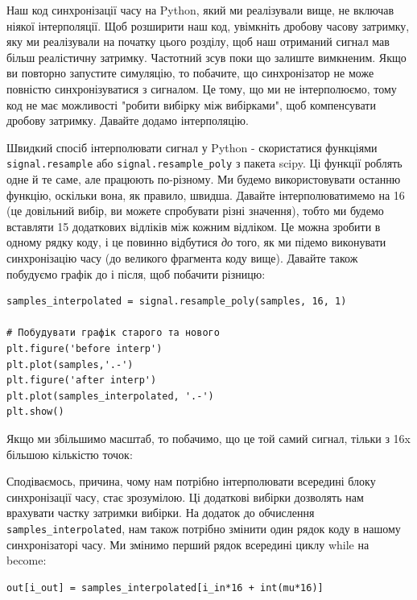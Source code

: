 Наш код синхронізації часу на Python, який ми реалізували вище, не
включав ніякої інтерполяції. Щоб розширити наш код, увімкніть дробову
часову затримку, яку ми реалізували на початку цього розділу, щоб наш
отриманий сигнал мав більш реалістичну затримку. Частотний зсув поки що
залиште вимкненим. Якщо ви повторно запустите симуляцію, то побачите, що
синхронізатор не може повністю синхронізуватися з сигналом. Це тому, що
ми не інтерполюємо, тому код не має можливості "робити вибірку між
вибірками", щоб компенсувати дробову затримку. Давайте додамо
інтерполяцію.

Швидкий спосіб інтерполювати сигнал у Python - скористатися функціями
\texttt{signal.resample} або \texttt{signal.resample\_poly} з пакета
scipy. Ці функції роблять одне й те саме, але працюють по-різному. Ми
будемо використовувати останню функцію, оскільки вона, як правило,
швидша. Давайте інтерполюватимемо на 16 (це довільний вибір, ви можете
спробувати різні значення), тобто ми будемо вставляти 15 додаткових
відліків між кожним відліком. Це можна зробити в одному рядку коду, і це
повинно відбутися \emph{до} того, як ми підемо виконувати синхронізацію
часу (до великого фрагмента коду вище). Давайте також побудуємо графік
до і після, щоб побачити різницю:

\begin{Verbatim}[breaklines=true,breakanywhere=true,fontsize=\small]
samples_interpolated = signal.resample_poly(samples, 16, 1)

# Побудувати графік старого та нового
plt.figure('before interp')
plt.plot(samples,'.-')
plt.figure('after interp')
plt.plot(samples_interpolated, '.-')
plt.show()
\end{Verbatim}

Якщо ми збільшимо масштаб, то побачимо, що це той самий сигнал, тільки з
16x більшою кількістю точок:

\href{../_images/time-sync-interpolated-samples.svg}{}

Сподіваємось, причина, чому нам потрібно інтерполювати всередині блоку
синхронізації часу, стає зрозумілою. Ці додаткові вибірки дозволять нам
врахувати частку затримки вибірки. На додаток до обчислення
\texttt{samples\_interpolated}, нам також потрібно змінити один рядок
коду в нашому синхронізаторі часу. Ми змінимо перший рядок всередині
циклу while на become:

\begin{Verbatim}[breaklines=true,breakanywhere=true,fontsize=\small]
out[i_out] = samples_interpolated[i_in*16 + int(mu*16)]
\end{Verbatim}

